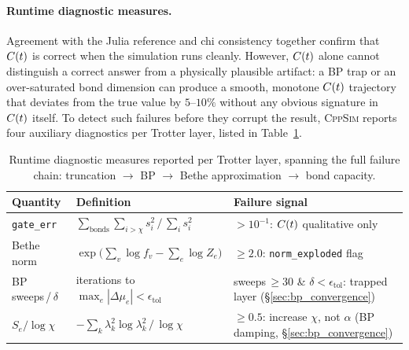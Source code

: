 \paragraph{Runtime diagnostic measures.}
Agreement with the Julia reference and chi consistency together confirm that
$C(t)$ is correct when the simulation runs cleanly.
However, $C(t)$ alone cannot distinguish a correct answer from a physically
plausible artifact: a BP trap or an over-saturated bond dimension can produce
a smooth, monotone $C(t)$ trajectory that deviates from the true value by
$5$--$10\%$ without any obvious signature in $C(t)$ itself.
To detect such failures before they corrupt the result, \textsc{CppSim} reports
four auxiliary diagnostics per Trotter layer, listed in
Table~\ref{tab:diagnostics}.

\begin{table}[ht]
\small\centering
\caption{Runtime diagnostic measures reported per Trotter layer,
 spanning the full failure chain: truncation $\to$ BP $\to$
 Bethe approximation $\to$ bond capacity.}
\label{tab:diagnostics}
\begin{tabular}{lll}
\toprule
Quantity & Definition & Failure signal \\
\midrule
\texttt{gate\_err} &
 $\sum_{\text{bonds}} \sum_{i>\chi} s_i^2 \,/\, \sum_i s_i^2$ &
 $> 10^{-1}$: $C(t)$ qualitative only \\
Bethe norm &
 $\exp\!\bigl(\sum_v \log f_v - \sum_e \log Z_e\bigr)$ &
 $\geq 2.0$: \texttt{norm\_exploded} flag \\
BP sweeps\,/\,$\delta$ &
 iterations to $\max_e|\Delta\mu_e| < \epsilon_{\mathrm{tol}}$ &
 sweeps\,$\geq 30$ \& $\delta < \epsilon_{\mathrm{tol}}$: trapped layer (\S\ref{sec:bp_convergence}) \\
$S_e / \log\chi$ &
 $-\sum_k \lambda_k^2 \log\lambda_k^2 \,/\, \log\chi$ &
 $\geq 0.5$: increase $\chi$, not $\alpha$ (BP damping, \S\ref{sec:bp_convergence}) \\
\bottomrule
\end{tabular}
\end{table}

